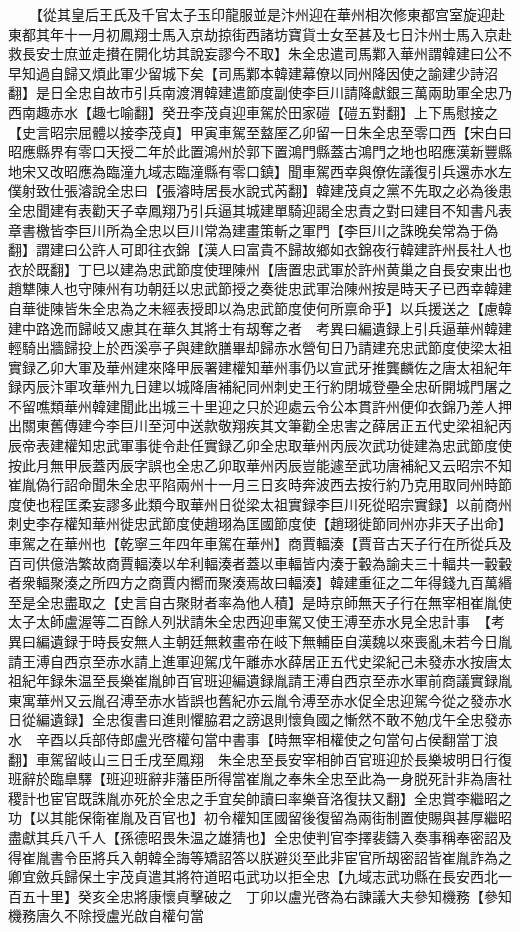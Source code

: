 　　【從其皇后王氏及千官太子玉印龍服並是汴州迎在華州相次修東都宫室旋迎赴東都其年十一月初鳳翔士馬入京劫掠街西諸坊寶貨士女至甚及七日汴州士馬入京赴救長安士庶並走攅在開化坊其說妄謬今不取】朱全忠遣司馬鄴入華州謂韓建曰公不早知過自歸又煩此軍少留城下矣【司馬鄴本韓建幕僚以同州降因使之諭建少詩沼翻】是日全忠自故市引兵南渡渭韓建遣節度副使李巨川請降獻銀三萬兩助軍全忠乃西南趣赤水【趣七喻翻】癸丑李茂貞迎車駕於田家磑【磑五對翻】上下馬慰接之【史言昭宗屈體以接李茂貞】甲寅車駕至盩厔乙卯留一日朱全忠至零口西【宋白曰昭應縣界有零口天授二年於此置鴻州於郭下置鴻門縣蓋古鴻門之地也昭應漢新豐縣地宋又改昭應為臨潼九域志臨潼縣有零口鎮】聞車駕西幸與僚佐議復引兵還赤水左僕射致仕張濬說全忠曰【張濬時居長水說式芮翻】韓建茂貞之黨不先取之必為後患全忠聞建有表勸天子幸鳳翔乃引兵逼其城建單騎迎謁全忠責之對曰建目不知書凡表章書檄皆李巨川所為全忠以巨川常為建畫策斬之軍門【李巨川之誅晚矣常為于偽翻】謂建曰公許人可即往衣錦【漢人曰富貴不歸故鄉如衣錦夜行韓建許州長社人也衣於既翻】丁巳以建為忠武節度使理陳州【唐置忠武軍於許州黄巢之自長安東出也趙犨陳人也守陳州有功朝廷以忠武節授之奏徙忠武軍治陳州按是時天子已西幸韓建自華徙陳皆朱全忠為之未經表授即以為忠武節度使何所禀命乎】以兵援送之【慮韓建中路逸而歸岐又慮其在華久其將士有刼奪之者　考異曰編遺録上引兵逼華州韓建輕騎出牆歸投上於西溪亭子與建飲膳畢却歸赤水營旬日乃請建充忠武節度使梁太祖實録乙卯大軍及華州建來降甲辰署建權知華州事仍以宣武牙推龔麟佐之唐太祖紀年録丙辰汴軍攻華州九日建以城降唐補紀同州刺史王行約閉城登壘全忠斫開城門屠之不留噍類華州韓建聞此出城三十里迎之只於迎處云令公本貫許州便仰衣錦乃差人押出關東舊傳建今李巨川至河中送款敬翔疾其文筆勸全忠害之薛居正五代史梁祖紀丙辰帝表建權知忠武軍事徙令赴任實録乙卯全忠取華州丙辰次武功徙建為忠武節度使按此月無甲辰蓋丙辰字誤也全忠乙卯取華州丙辰豈能遽至武功唐補紀又云昭宗不知崔胤偽行詔命聞朱全忠平陷兩州十一月三日亥時奔波西去按行約乃克用取同州時節度使也程匡柔妄謬多此類今取華州日從梁太祖實録李巨川死從昭宗實録】以前商州刺史李存權知華州徙忠武節度使趙珝為匡國節度使【趙珝徙節同州亦非天子出命】車駕之在華州也【乾寧三年四年車駕在華州】商賈輻湊【賈音古天子行在所從兵及百司供億浩繁故商賈輻湊以牟利輻湊者蓋以車輻皆内湊于轂為諭夫三十輻共一轂轂者衆輻聚湊之所四方之商賈内嚮而聚湊焉故曰輻湊】韓建重征之二年得錢九百萬緡至是全忠盡取之【史言自古聚財者率為他人積】是時京師無天子行在無宰相崔胤使太子太師盧渥等二百餘人列狀請朱全忠西迎車駕又使王溥至赤水見全忠計事　【考異曰編遺録于時長安無人主朝廷無敕畫帝在岐下無輔臣自漢魏以來喪亂未若今日胤請王溥自西京至赤水請上進軍迎駕戊午離赤水薛居正五代史梁紀己未發赤水按唐太祖紀年録朱温至長樂崔胤帥百官班迎編遺録胤請王溥自西京至赤水軍前商議實録胤東寓華州又云胤召溥至赤水皆誤也舊紀亦云胤令溥至赤水促全忠迎駕今從之發赤水日從編遺録】全忠復書曰進則懼脇君之謗退則懷負國之慚然不敢不勉戊午全忠發赤水　辛酉以兵部侍郎盧光啓權句當中書事【時無宰相權使之句當句占侯翻當丁浪翻】車駕留岐山三日壬戌至鳳翔　朱全忠至長安宰相帥百官班迎於長樂坡明日行復班辭於臨臯驛【班迎班辭非藩臣所得當崔胤之奉朱全忠至此為一身脱死計非為唐社稷計也宦官既誅胤亦死於全忠之手宜矣帥讀曰率樂音洛復扶又翻】全忠賞李繼昭之功【以其能保衛崔胤及百官也】初令權知匡國留後復留為兩街制置使賜與甚厚繼昭盡獻其兵八千人【孫德昭畏朱温之雄猜也】全忠使判官李擇裴鑄入奏事稱奉密詔及得崔胤書令臣將兵入朝韓全誨等矯詔答以朕避災至此非宦官所刼密詔皆崔胤詐為之卿宜斂兵歸保土宇茂貞遣其將符道昭屯武功以拒全忠【九域志武功縣在長安西北一百五十里】癸亥全忠將康懷貞擊破之　丁卯以盧光啓為右諫議大夫參知機務【參知機務唐久不除授盧光啟自權句當